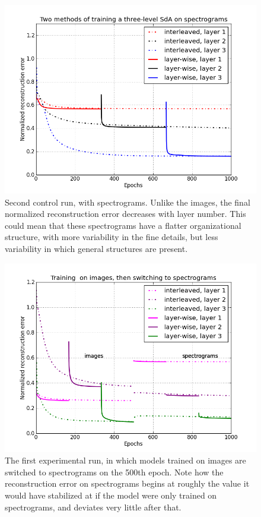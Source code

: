 \documentclass[12pt]{article}
\begin{document}
\begin{doublespacing}
\begin{figure}[p]
\centering
\includegraphics[width=6in]{graph_spect_only}
\caption{Second control run, with spectrograms. Unlike the images, the final normalized reconstruction error decreases with layer number. This could mean that these spectrograms have a flatter organizational structure, with more variability in the fine details, but less variability in which general structures are present.}
\label{fig:graph_spect_only}
\end{figure}

\begin{figure}[p]
\centering
\includegraphics[width=6in]{graph_cross_im_spec}
\caption{The first experimental run, in which models trained on images are switched to spectrograms on the 500th epoch. Note how the reconstruction error on spectrograms begins at roughly the value it would have stabilized at if the model were only trained on spectrograms, and deviates very little after that.}
\label{fig:graph_cross_im_spec}
\end{figure}


\end{doublespacing}
\end{document}
